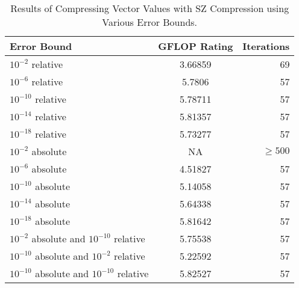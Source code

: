 \begin{table}
	\centering
	\begin{tabular}{l|S|r}
		Error Bound & {GFLOP Rating} & Iterations \\
		\hline
		\(10^{-2}\) relative & 3.66859 & 69 \\
		\(10^{-6}\) relative & 5.7806 & 57 \\
		\(10^{-10}\) relative & 5.78711 & 57 \\
		\(10^{-14}\) relative & 5.81357 & 57 \\
		\(10^{-18}\) relative & 5.73277 & 57 \\
		\(10^{-2}\) absolute & {NA} & \(\geq 500\) \\
		\(10^{-6}\) absolute & 4.51827 & 57 \\
		\(10^{-10}\) absolute & 5.14058 & 57\\
		\(10^{-14}\) absolute & 5.64338 & 57 \\
		\(10^{-18}\) absolute & 5.81642 & 57 \\
		\(10^{-2}\) absolute and \(10^{-10}\) relative & 5.75538 & 57 \\
		\(10^{-10}\) absolute and \(10^{-2}\) relative & 5.22592 & 57 \\
		\(10^{-10}\) absolute and \(10^{-10}\) relative & 5.82527 & 57 \\
	\end{tabular}
	\caption{Results of Compressing Vector Values with SZ Compression using Various Error Bounds.}
	\label{tab:results-vec-SZ}
\end{table}